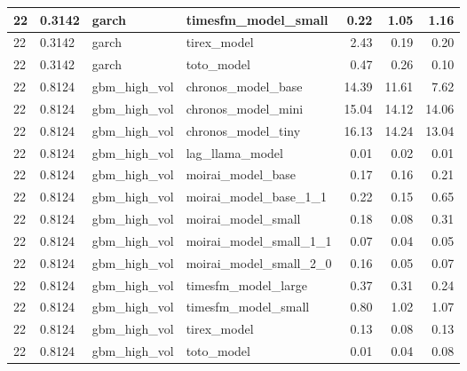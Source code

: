 {\begin{tabular}{llllrrr}
\midrule
22 & 0.3142 & garch & timesfm\_model\_small & 0.22 & 1.05 & 1.16 \\
\midrule
22 & 0.3142 & garch & tirex\_model & 2.43 & 0.19 & 0.20 \\
\midrule
22 & 0.3142 & garch & toto\_model & 0.47 & 0.26 & 0.10 \\
\midrule
22 & 0.8124 & gbm\_high\_vol & chronos\_model\_base & 14.39 & 11.61 & 7.62 \\
\midrule
22 & 0.8124 & gbm\_high\_vol & chronos\_model\_mini & 15.04 & 14.12 & 14.06 \\
\midrule
22 & 0.8124 & gbm\_high\_vol & chronos\_model\_tiny & 16.13 & 14.24 & 13.04 \\
\midrule
22 & 0.8124 & gbm\_high\_vol & lag\_llama\_model & 0.01 & 0.02 & 0.01 \\
\midrule
22 & 0.8124 & gbm\_high\_vol & moirai\_model\_base & 0.17 & 0.16 & 0.21 \\
\midrule
22 & 0.8124 & gbm\_high\_vol & moirai\_model\_base\_1\_1 & 0.22 & 0.15 & 0.65 \\
\midrule
22 & 0.8124 & gbm\_high\_vol & moirai\_model\_small & 0.18 & 0.08 & 0.31 \\
\midrule
22 & 0.8124 & gbm\_high\_vol & moirai\_model\_small\_1\_1 & 0.07 & 0.04 & 0.05 \\
\midrule
22 & 0.8124 & gbm\_high\_vol & moirai\_model\_small\_2\_0 & 0.16 & 0.05 & 0.07 \\
\midrule
22 & 0.8124 & gbm\_high\_vol & timesfm\_model\_large & 0.37 & 0.31 & 0.24 \\
\midrule
22 & 0.8124 & gbm\_high\_vol & timesfm\_model\_small & 0.80 & 1.02 & 1.07 \\
\midrule
22 & 0.8124 & gbm\_high\_vol & tirex\_model & 0.13 & 0.08 & 0.13 \\
\midrule
22 & 0.8124 & gbm\_high\_vol & toto\_model & 0.01 & 0.04 & 0.08 \\
\bottomrule
\end{tabular}
}
